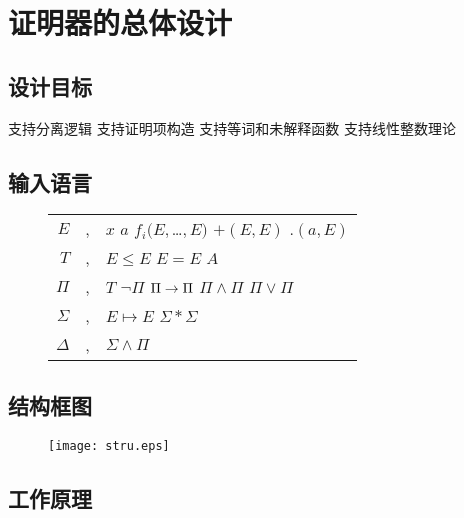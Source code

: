 \chapter{证明器的总体设计}
\label{chap:struct}

\section{设计目标}
支持分离逻辑
支持证明项构造
支持等词和未解释函数
支持线性整数理论
\section{输入语言}

\begin{figure}[!htbp]
  \centering
  \begin{tabular}[rcl]{rcl}
    $E$ & \sep{} & $x$ \deli{} $a$ \deli{} $f_i(E,$\ldots$,E)$ \deli{} $+(E, E)$ \deli{} $.(a,E)$ \\
    $T$ & \sep{} & $E \le E$ \deli{} $E = E$ \deli{} $A$ \\
    $\Pi$ & \sep{} & $T$ \deli{}  $\lnot \Pi$ \deli{} $\Pi \rightarrow \Pi$ \deli{} $\Pi \land \Pi$ \deli{} $\Pi \lor \Pi$ \\
    $\Sigma$ & \sep{} & $E \mapsto E$ \deli{} $\Sigma \ast \Sigma$ \\
    $\Delta$ & \sep{} & $\Sigma \land \Pi$ \\
  \end{tabular}
\end{figure}


\section{结构框图}

\begin{figure}[!htbp]
  \centering
  \texttt{[image: stru.eps]}
\end{figure}

\section{工作原理}

